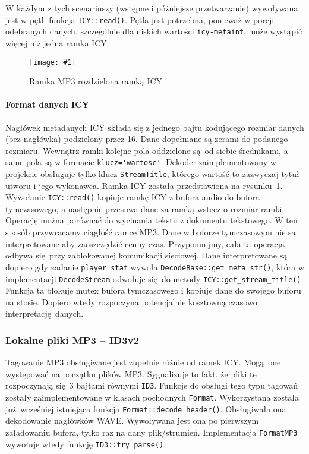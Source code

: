 \documentclass[polish]{aghengthesis}
\newcommand{\imgint}[4]{
	\begin{figure}[{#4}]
		\centering
		\texttt{[image: \#1]}
		\caption{#2}
		\label{#1}
	\end{figure}
}
\newcommand{\imgcs}[3]{\imgint{#1}{#2}{#3}{}}
\begin{document}
			W każdym z tych scenariuszy (wstępne i późniejsze przetwarzanie) wywoływana jest w pętli funkcja \lstinline|ICY::read()|. Pętla jest potrzebna, ponieważ w porcji odebranych danych, szczególnie dla niskich wartości \lstinline|icy-metaint|, może wystąpić więcej niż jedna ramka ICY.
			
			\imgcs{3/PicoRadio-icy}{Ramka MP3 rozdzielona ramką ICY}{0.9}
			\paragraph{Format danych ICY}
				Nagłówek metadanych ICY składa się z jednego bajtu kodującego rozmiar danych (bez nagłówka) podzielony przez 16. Dane dopełniane są zerami do podanego rozmiaru. Wewnątrz ramki kolejne pola oddzielone są od siebie średnikami, a same pola są w formacie \lstinline|klucz='wartosc'|. Dekoder zaimplementowany w projekcie obsługuje tylko klucz \lstinline|StreamTitle|, którego wartość to zazwyczaj tytuł utworu i jego wykonawca. Ramka ICY została przedstawiona na rysunku~\ref{3/PicoRadio-icy}.
				$ $\\
				
			Wywołanie \lstinline|ICY::read()| kopiuje ramkę ICY z bufora audio do bufora tymczasowego, a następnie przesuwa dane za ramką wstecz o rozmiar ramki. Operację można porównać do wycinania tekstu z dokumentu tekstowego. W ten sposób przywracamy ciągłość ramce MP3. Dane w buforze tymczasowym nie są interpretowane aby zaoszczędzić cenny czas. Przypomnijmy, cała ta operacja odbywa się przy zablokowanej komunikacji sieciowej. Dane interpretowane są dopiero gdy zadanie \lstinline|player stat| wywoła \lstinline|DecodeBase::get_meta_str()|, która w implementacji \lstinline|DecodeStream| odwołuje się do metody \lstinline|ICY::get_stream_title()|. Funkcja ta blokuje mutex bufora tymczasowego i kopiuje dane do swojego buforu na stosie. Dopiero wtedy rozpoczyna potencjalnie kosztowną czasowo interpretację danych.
		
		\subsubsection{Lokalne pliki MP3 -- ID3v2}
			Tagowanie MP3 obsługiwane jest zupełnie różnie od ramek ICY. Mogą one występować na początku plików MP3. Sygnalizuje to fakt, że pliki te rozpoczynają się 3 bajtami równymi \lstinline|ID3|. Funkcje do obsługi tego typu tagowań zostały zaimplementowane w klasach pochodnych \lstinline|Format|. Wykorzystana została już wcześniej istniejąca funkcja \lstinline|Format::decode_header()|. Obsługiwała ona dekodowanie nagłówków WAVE. Wywoływana jest ona po pierwszym załadowaniu bufora, tylko raz na dany plik/strumień. Implementacja \lstinline|FormatMP3| wywołuje wtedy funkcję \lstinline|ID3::try_parse()|.
			
\end{document}
